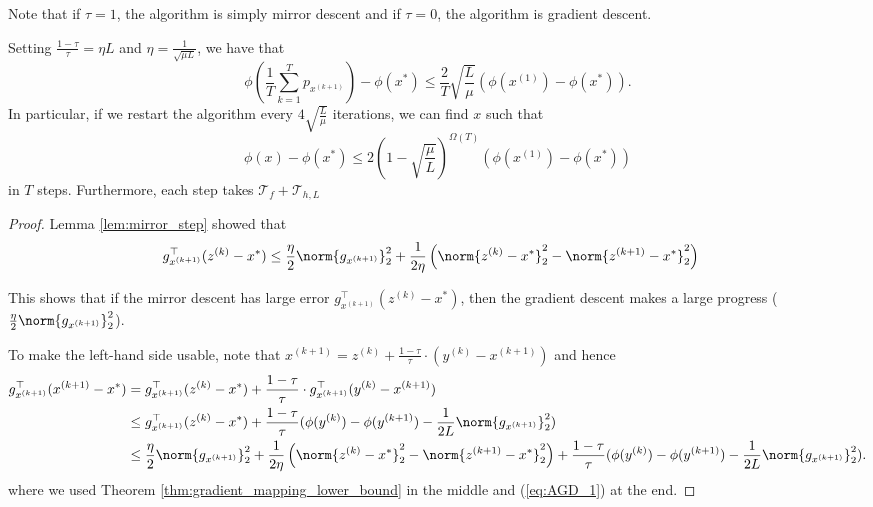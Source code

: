Note that if $\tau=1$, the algorithm is simply mirror descent and
if $\tau=0$, the algorithm is gradient descent.
\begin{thm}
\label{thm:AGD}Setting $\frac{1-\tau}{\tau}=\eta L$ and $\eta=\frac{1}{\sqrt{\mu L}}$,
we have that
\[
\phi(\frac{1}{T}\sum_{k=1}^{T}p_{x^{(k+1)}})-\phi(x^{*})\leq\frac{2}{T}\sqrt{\frac{L}{\mu}}\left(\phi(x^{(1)})-\phi(x^{*})\right).
\]
In particular, if we restart the algorithm every $4\sqrt{\frac{L}{\mu}}$
iterations, we can find $x$ such that 
\[
\phi(x)-\phi(x^{*})\leq2(1-\sqrt{\frac{\mu}{L}})^{\Omega(T)}\left(\phi(x^{(1)})-\phi(x^{*})\right)
\]
in $T$ steps. Furthermore, each step takes $\mathcal{T}_{f}+\mathcal{T}_{h,L}$
\end{thm}

\begin{proof}
Lemma \ref{lem:mirror_step} showed that
\begin{align}
g_{x^{(k+1)}}^{\top}(z^{(k)}-x^{*}) & \leq\frac{\eta}{2}\norm{g_{x^{(k+1)}}}_{2}^{2}+\frac{1}{2\eta}\left(\norm{z^{(k)}-x^{*}}_{2}^{2}-\norm{z^{(k+1)}-x^{*}}_{2}^{2}\right)\label{eq:AGD_1}
\end{align}

This shows that if the mirror descent has large error $g_{x^{(k+1)}}^{\top}(z^{(k)}-x^{*})$,
then the gradient descent makes a large progress ($\frac{\eta}{2}\norm{g_{x^{(k+1)}}}_{2}^{2}$).

To make the left-hand side usable, note that $x^{(k+1)}=z^{(k)}+\frac{1-\tau}{\tau}\cdot(y^{(k)}-x^{(k+1)})$
and hence
\begin{align*}
g_{x^{(k+1)}}^{\top}(x^{(k+1)}-x^{*}) & =g_{x^{(k+1)}}^{\top}(z^{(k)}-x^{*})+\frac{1-\tau}{\tau}\cdot g_{x^{(k+1)}}^{\top}(y^{(k)}-x^{(k+1)})\\
 & \leq g_{x^{(k+1)}}^{\top}(z^{(k)}-x^{*})+\frac{1-\tau}{\tau}(\phi(y^{(k)})-\phi(y^{(k+1)})-\frac{1}{2L}\norm{g_{x^{(k+1)}}}_{2}^{2})\\
 & \leq\frac{\eta}{2}\norm{g_{x^{(k+1)}}}_{2}^{2}+\frac{1}{2\eta}\left(\norm{z^{(k)}-x^{*}}_{2}^{2}-\norm{z^{(k+1)}-x^{*}}_{2}^{2}\right)+\frac{1-\tau}{\tau}(\phi(y^{(k)})-\phi(y^{(k+1)})-\frac{1}{2L}\norm{g_{x^{(k+1)}}}_{2}^{2}).
\end{align*}
where we used Theorem \ref{thm:gradient_mapping_lower_bound} in the
middle and (\ref{eq:AGD_1}) at the end.


\end{proof}
